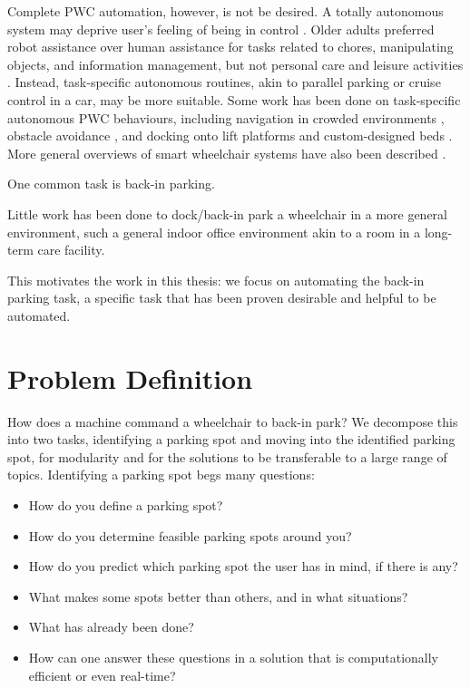 Complete PWC automation, however, is not be desired. 
A totally autonomous system may deprive user's feeling of being in control 
\cite{viswanathana2014wizard}.
Older adults preferred robot assistance over human assistance for tasks related
to chores, manipulating objects, and information management, but not personal
care and leisure activities \cite{smarr2014domestic}.
Instead, task-specific autonomous routines, akin to parallel parking or cruise
control in a car, may be more suitable.
Some work has been done on task-specific autonomous PWC behaviours, including
navigation in crowded environments \cite{prassler2001robotics}, obstacle
avoidance \cite{viswanathan2012navigation}, and docking onto lift platforms
\cite{sermeno2006vision} and custom-designed beds \cite{ren2012docking}.
More general overviews of smart wheelchair systems have also been described
\cite{viswanathan2012navigation, simpson2005smart, faria2013patient}. 

One common task is back-in parking.

Little work has been done to dock/back-in park a wheelchair in a more general
environment, such a general indoor office environment akin to a room in a
long-term care facility. 

This motivates the work in this thesis: we focus on automating the back-in
parking task, a specific task that has been proven desirable and helpful to be
automated.

\section{Problem Definition}
How does a machine command a wheelchair to back-in park? We decompose this into two
tasks, identifying a parking spot and moving into the identified parking spot,
for modularity and for the solutions to be transferable to a large range of
topics.
Identifying a parking spot begs many questions:
\begin{itemize}
\item How do you define a parking spot?
\item How do you determine feasible parking spots around you?
\item How do you predict which parking spot the user has in mind, if there is any?
\item What makes some spots better than others, and in what situations?
\item What has already been done?
\item How can one answer these questions in a solution that is 
computationally efficient or even real-time?
\end{itemize}



